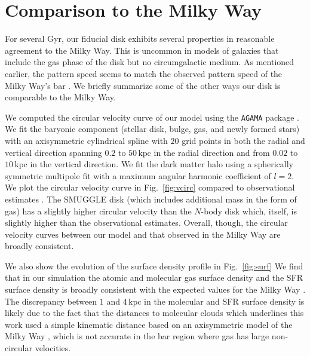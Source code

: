 \documentclass[fleqn,usenatbib]{mnras}
\newcommand{\Nbody}{$N$-body}
\begin{document}
\section{Comparison to the Milky Way}
\label{app:milkyway}
For several Gyr, our fiducial disk exhibits several properties in reasonable
agreement to the Milky Way. This is uncommon in models of galaxies that include
the gas phase of the disk but no circumgalactic medium. As mentioned earlier,
the pattern speed seems to match the observed pattern speed of the Milky Way's
bar \citep{2019MNRAS.490.4740B}. We briefly summarize some of the other ways our
disk is comparable to the Milky Way.

We computed the circular velocity curve of our model using the \texttt{AGAMA}
package \citep{2019MNRAS.482.1525V}. We fit the baryonic component (stellar disk,
bulge, gas, and newly formed stars) with an axisymmetric cylindrical spline with
$20$ grid points in both the radial and vertical direction spanning $0.2$ to
$50\,\textrm{kpc}$ in the radial direction and from $0.02$ to $10\,\textrm{kpc}$
in the vertical direction. We fit the dark matter halo using a spherically
symmetric multipole fit with a maximum angular harmonic coefficient of $l=2$. We
plot the circular velocity curve in Fig.~\ref{fig:vcirc} compared to
observational estimates \citep{2019ApJ...871..120E}. The SMUGGLE disk (which
includes additional mass in the form of gas) has a slightly higher circular
velocity than the \Nbody{} disk which, itself, is slightly higher than the
observational estimates. Overall, though, the circular velocity curves between
our model and that observed in the Milky Way are broadly consistent.

We also show the evolution of the surface density profile in Fig.~\ref{fig:surf}
We find that in our simulation the atomic and molecular gas surface density and
the SFR surface density is broadly consistent with the expected values for the
Milky Way \citep{2008AA...487..951K,2022ApJ...929L..18E}. The discrepancy between
$1$ and $4\,\textrm{kpc}$ in the molecular and SFR surface density is likely due
to the fact that the distances to molecular clouds which underlines this work
used a simple kinematic distance based on an axisymmetric model of the Milky
Way \citep{2017ApJ...834...57M}, which is not accurate in the bar region where gas
has large non-circular velocities.
\end{document}

